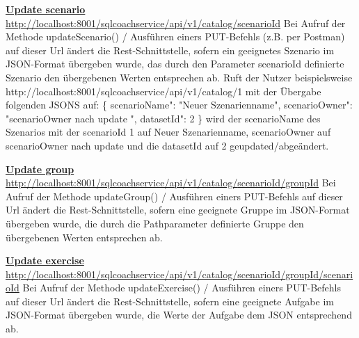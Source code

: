 \documentclass[fleqn,10pt,ngerman]{SelfArx}
\begin{document}
	\noindent
	\underline{\textbf{Update scenario}}\newline
	\underline{http://localhost:8001/sqlcoachservice/api/v1/catalog}\newline\underline{/{scenarioId}}\newline
	Bei Aufruf der Methode updateScenario() / Ausführen einers PUT-Befehls (z.B. per Postman) auf dieser Url ändert die Rest-Schnittstelle, sofern ein geeignetes Szenario im JSON-Format übergeben wurde, das durch den Parameter scenarioId definierte Szenario den übergebenen Werten entsprechen ab. 
	Ruft der Nutzer beispielsweise \newline http://localhost:8001/sqlcoachservice/api/v1/catalog/1 mit der Übergabe folgenden JSONS auf:\newline
	 \{      \newline
		\grqq scenarioName": "Neuer Szenarienname",\newline
		\grqq scenarioOwner": "scenarioOwner nach update ",\newline
		\grqq datasetId": 2\newline
	\}\newline
	wird der scenarioName des Szenarios mit der scenarioId 1 auf Neuer Szenarienname, scenarioOwner auf scenarioOwner nach update und die datasetId auf 2 geupdated/abgeändert.
	\newline\newline
	
	\noindent
		\underline{\textbf{Update group}}\newline
	\underline{http://localhost:8001/sqlcoachservice/api/v1/catalog}\newline\underline{/{scenarioId}/{groupId}}\newline
	Bei Aufruf der Methode updateGroup() / Ausführen einers PUT-Befehls auf dieser Url ändert die Rest-Schnittstelle, sofern eine geeignete Gruppe im JSON-Format übergeben wurde, die durch die Pathparameter definierte Gruppe den übergebenen Werten entsprechen ab. 
	\newline\newline

	\noindent
	\underline{\textbf{Update exercise}}\newline
	\underline{http://localhost:8001/sqlcoachservice/api/v1/catalog}\newline\underline{/{scenarioId}/{groupId}/scenarioId}\newline
		Bei Aufruf der Methode updateExercise() / Ausführen einers PUT-Befehls auf dieser Url ändert die Rest-Schnittstelle, sofern eine geeignete Aufgabe im JSON-Format übergeben wurde, die Werte der Aufgabe dem JSON entsprechend ab.
		\newline\newline
	
\end{document}
